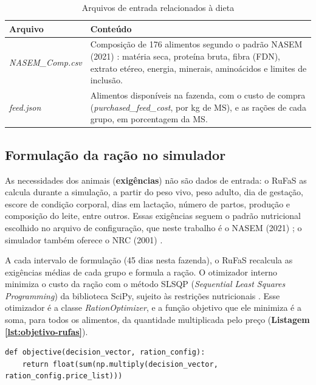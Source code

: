 \documentclass[a4paper,12pt]{article}
\begin{document}
\begin{table}[htbp]
    \centering
    \caption{Arquivos de entrada relacionados à dieta}
    \label{tab:arquivos-dieta}
    \begin{tabular}{L{4cm}L{12cm}}
        \toprule
        \textbf{Arquivo} & \textbf{Conteúdo} \\
        \midrule
        \textit{NASEM\_Comp.csv} & Composição de 176 alimentos segundo o padrão NASEM (2021) \cite{nasem2021}: matéria seca, proteína bruta, fibra (FDN), extrato etéreo, energia, minerais, aminoácidos e limites de inclusão. \\
        \textit{feed.json} & Alimentos disponíveis na fazenda, com o custo de compra (\textit{purchased\_feed\_cost}, por kg de MS), e as rações de cada grupo, em porcentagem da MS. \\
        \bottomrule
    \end{tabular}
\end{table}

\subsection{Formulação da ração no simulador}

As necessidades dos animais (\textbf{exigências}) não são dados de entrada: o RuFaS as calcula durante a simulação, a partir do peso vivo, peso adulto, dia de gestação, escore de condição corporal, dias em lactação, número de partos, produção e composição do leite, entre outros. Essas exigências seguem o padrão nutricional escolhido no arquivo de configuração, que neste trabalho é o NASEM (2021) \cite{nasem2021}; o simulador também oferece o NRC (2001) \cite{nrc2001}.

A cada intervalo de formulação (45 dias nesta fazenda), o RuFaS recalcula as exigências médias de cada grupo e formula a ração. O otimizador interno minimiza o custo da ração com o método SLSQP (\textit{Sequential Least Squares Programming}) da biblioteca SciPy, sujeito às restrições nutricionais \cite{slides:rufas}. Esse otimizador é a classe \textit{RationOptimizer}, e a função objetivo que ele minimiza é a soma, para todos os alimentos, da quantidade multiplicada pelo preço (\textbf{Listagem \ref{lst:objetivo-rufas}}).

\begin{lstlisting}[caption={Função objetivo do otimizador de ração do RuFaS (\textit{ration\_optimizer.py}).}, label={lst:objetivo-rufas}]
def objective(decision_vector, ration_config):
    return float(sum(np.multiply(decision_vector, ration_config.price_list)))
\end{lstlisting}
\end{document}
